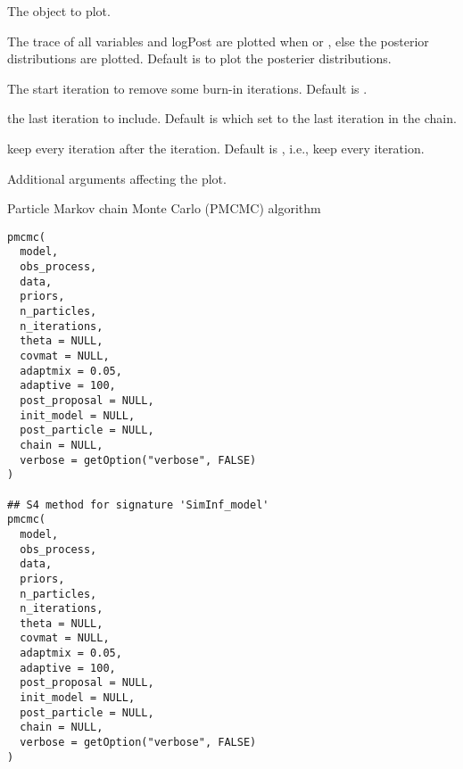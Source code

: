 \documentclass[letterpaper]{book}
\begin{document}
\begin{Arguments}
\begin{ldescription}
\item[\code{x}] The  object to plot.

\item[\code{y}] The trace of all variables and logPost are plotted when
 or , else the posterior
distributions are plotted. Default is to plot the posterier
distributions.

\item[\code{start}] The start iteration to remove some burn-in
iterations. Default is .

\item[\code{end}] the last iteration to include. Default is 
which set  to the last iteration in the chain.

\item[\code{thin}] keep every  iteration after the
 iteration. Default is , i.e., keep
every iteration.

\item[\code{...}] Additional arguments affecting the plot.
\end{ldescription}
\end{Arguments}
%
\begin{Description}
Particle Markov chain Monte Carlo (PMCMC) algorithm
\end{Description}
%
\begin{Usage}
\begin{verbatim}
pmcmc(
  model,
  obs_process,
  data,
  priors,
  n_particles,
  n_iterations,
  theta = NULL,
  covmat = NULL,
  adaptmix = 0.05,
  adaptive = 100,
  post_proposal = NULL,
  init_model = NULL,
  post_particle = NULL,
  chain = NULL,
  verbose = getOption("verbose", FALSE)
)

## S4 method for signature 'SimInf_model'
pmcmc(
  model,
  obs_process,
  data,
  priors,
  n_particles,
  n_iterations,
  theta = NULL,
  covmat = NULL,
  adaptmix = 0.05,
  adaptive = 100,
  post_proposal = NULL,
  init_model = NULL,
  post_particle = NULL,
  chain = NULL,
  verbose = getOption("verbose", FALSE)
)
\end{verbatim}
\end{Usage}
%
\end{document}
